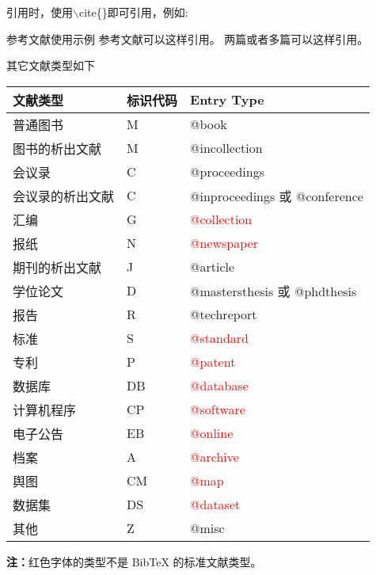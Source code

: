\noindent 引用时，使用{\ttfamily$\backslash$cite\{\}}即可引用，例如:
\begin{myexample}{参考文献使用示例}
参考文献可以这样引用\cite{Liu2013}。
两篇或者多篇可以这样引用\cite{Liu2013,Driscoll2024aaa}。
\end{myexample}

\noindent 其它文献类型如下
\begin{mybox}
\begin{tabular}{p{4.5cm}p{2cm}p{6.5cm}}
文献类型         &  标识代码 &  Entry Type\\
\hline
普通图书         &  M        &  @book \\
图书的析出文献   &  M        &  @incollection\\
会议录           &  C        &  @proceedings\\
会议录的析出文献 &  C        &  @inproceedings 或 @conference\\
汇编             &  G        & \textcolor{red}{@collection}\\
报纸             &  N        & \textcolor{red}{@newspaper}\\
期刊的析出文献   &  J        &  @article\\
学位论文         &  D        &  @mastersthesis 或 @phdthesis\\
报告             &  R        &  @techreport\\
标准             &  S        &  \textcolor{red}{@standard}\\
专利             &  P        &  \textcolor{red}{@patent}\\
数据库           &  DB       &  \textcolor{red}{@database}\\
计算机程序       &  CP       &  \textcolor{red}{@software}\\
电子公告         &  EB       & \textcolor{red}{@online}\\
档案             &  A        & \textcolor{red}{@archive}\\
舆图             &  CM       & \textcolor{red}{@map}\\
数据集           &  DS       & \textcolor{red}{@dataset}\\
其他             &  Z        &  @misc\\
\hline
\end{tabular}

\vspace{0.5cm}
{\bfseries 注：}红色字体的类型不是 BibTeX 的标准文献类型。
\end{mybox}

